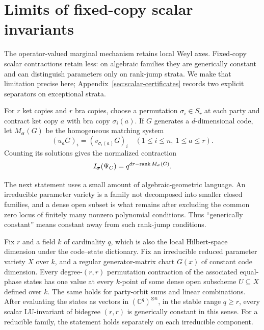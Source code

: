 \section{Limits of fixed-copy scalar invariants}\label{sec:invariants}

The operator-valued marginal mechanism retains local Weyl axes.  Fixed-copy
scalar contractions retain less: on algebraic families they are generically
constant and can distinguish parameters only on rank-jump strata.  We make
that limitation precise here; Appendix~\ref{sec:scalar-certificates}
records two explicit separators on exceptional strata.

For \(r\) ket copies and \(r\) bra copies, choose a permutation
\(\sigma_i\in S_r\) at each party and contract ket copy \(a\) with bra
copy \(\sigma_i(a)\).  If \(G\) generates a \(d\)-dimensional code, let
\(M_{\boldsymbol\sigma}(G)\) be the homogeneous matching system
\[
 (u_aG)_i=(v_{\sigma_i(a)}G)_i
 \quad(1\leq i\leq n,\ 1\leq a\leq r).
\]
Counting its solutions gives the normalized contraction
\begin{equation}\label{eq:permutation-contraction}
 I_{\boldsymbol\sigma}(\Psi_C)
   =q^{dr-\operatorname{rank} M_{\boldsymbol\sigma}(G)}.
\end{equation}

The next statement uses a small amount of algebraic-geometric language.  An
irreducible parameter variety is a family not decomposed into smaller closed
families, and a dense open subset is what remains after excluding the common
zero locus of finitely many nonzero polynomial conditions.  Thus
``generically constant'' means constant away from such rank-jump conditions.

\begin{proposition}\label{thm:fixed-copy-boundary}
Fix \(r\) and a field \(k\) of cardinality \(q\), which is also the local
Hilbert-space dimension under the code--state dictionary.  Fix an
irreducible reduced parameter variety \(X\) over \(k\), and a regular
generator-matrix chart \(G(x)\) of constant code dimension.  Every
degree-\((r,r)\) permutation contraction of the associated equal-phase
states has one value at every \(k\)-point of some dense open subscheme
\(U\subseteq X\) defined over \(k\).  The same holds for party-orbit sums and
linear combinations.  After evaluating the states as vectors in
\((\mathbb C^q)^{\otimes n}\), in the stable range \(q\geq r\), every
scalar LU-invariant of bidegree \((r,r)\) is generically constant in this
sense.  For a reducible family, the statement holds separately on each
irreducible component.
\end{proposition}


